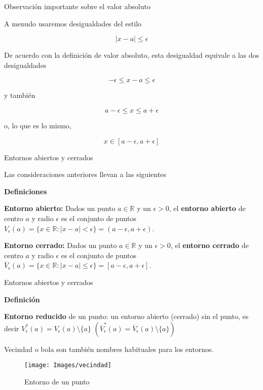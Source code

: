 \documentclass[
  ignorenonframetext,
]{beamer}
\begin{document}
\begin{frame}{Observación importante sobre el valor absoluto}
\protect\hypertarget{observaciuxf3n-importante-sobre-el-valor-absoluto}{}

A menudo usaremos desigualdades del estilo

\[
|x-a|\leq \epsilon
\]

De acuerdo con la definición de valor absoluto, esta desigualdad
equivale a las dos desigualdades

\[
-\epsilon \leq x-a \leq \epsilon
\]

y también

\[
a-\epsilon \leq x \leq a+ \epsilon
\]

o, lo que es lo mismo,

\[
x \in [a-\epsilon,a+\epsilon]
\]

\end{frame}

\begin{frame}{Entornos abiertos y cerrados}
\protect\hypertarget{entornos-abiertos-y-cerrados}{}

Las consideraciones anteriores llevan a las siguientes

\textbf{Definiciones}

\textbf{Entorno abierto:} Dados un punto \(a \in \mathbb{R}\) y un
\(\epsilon >0\), el \textbf{entorno abierto} de centro \(a\) y radio
\(\epsilon\) es el conjunto de puntos
\(V_{\epsilon}(a)=\{ x \in \mathbb{R}: |x-a|<\epsilon \} = (a-\epsilon, a+\epsilon)\).

\textbf{Entorno cerrado:} Dados un punto \(a \in \mathbb{R}\) y un
\(\epsilon >0\), el \textbf{entorno cerrado} de centro \(a\) y radio
\(\epsilon\) es el conjunto de puntos
\(\overline{V}_{\epsilon}(a)=\{ x \in \mathbb{R}: |x-a| \leq \epsilon \} = [a-\epsilon, a+\epsilon]\).

\end{frame}

\begin{frame}{Entornos abiertos y cerrados}
\protect\hypertarget{entornos-abiertos-y-cerrados-1}{}

\textbf{Definición}

\textbf{Entorno reducido} de un punto: un entorno abierto (cerrado) sin
el punto, es decir \(V^*_{\epsilon}(a)=V_{\epsilon}(a) \setminus \{a\}\)
\(\left(\overline{V}^*_{\epsilon}(a) = \overline{V}_{\epsilon}(a) \setminus \{a\}\right)\)

Vecindad o bola son también nombres habituales para los entornos.

\begin{figure}
\texttt{[image: Images/vecindad]} \caption{Entorno de un punto}\label{fig:vecin}
\end{figure}

\end{frame}
\end{document}
